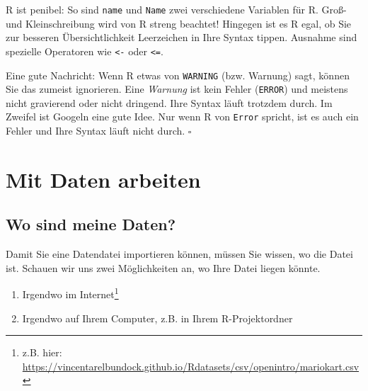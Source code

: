 \documentclass[
  letterpaper,
]{scrbook}
\providecommand{\tightlist}{%
  \setlength{\itemsep}{0pt}\setlength{\parskip}{0pt}}\usepackage{longtable,booktabs,array}
\theoremstyle{definition}
\theoremstyle{definition}
\theoremstyle{definition}
\theoremstyle{remark}
\begin{document}
\begin{tcolorbox}[enhanced jigsaw, colbacktitle=quarto-callout-caution-color!10!white, toptitle=1mm, colframe=quarto-callout-caution-color-frame, breakable, toprule=.15mm, bottomrule=.15mm, bottomtitle=1mm, left=2mm, opacitybacktitle=0.6, colback=white, arc=.35mm, coltitle=black, title=\textcolor{quarto-callout-caution-color}{\faFire}\hspace{0.5em}{Vorsicht}, opacityback=0, rightrule=.15mm, leftrule=.75mm, titlerule=0mm]

R ist penibel: So sind \texttt{name} und \texttt{Name} zwei verschiedene
Variablen für R. Groß- und Kleinschreibung wird von R streng beachtet!
Hingegen ist es R egal, ob Sie zur besseren Übersichtlichkeit
Leerzeichen in Ihre Syntax tippen. Ausnahme sind spezielle Operatoren
wie \texttt{\textless{}-} oder \texttt{\textless{}=}.

Eine gute Nachricht: Wenn R etwas von \texttt{WARNING} (bzw. Warnung)
sagt, können Sie das zumeist ignorieren. Eine \emph{Warnung} ist kein
Fehler (\texttt{ERROR}) und meistens nicht gravierend oder nicht
dringend. Ihre Syntax läuft trotzdem durch. Im Zweifel ist Googeln eine
gute Idee. Nur wenn R von \texttt{Error} spricht, ist es auch ein Fehler
und Ihre Syntax läuft nicht durch. \(\square\)

\end{tcolorbox}

\section{Mit Daten arbeiten}\label{mit-daten-arbeiten}

\subsection{Wo sind meine Daten?}\label{wo-sind-meine-daten}

Damit Sie eine Datendatei importieren können, müssen Sie wissen, wo die
Datei ist. Schauen wir uns zwei Möglichkeiten an, wo Ihre Datei liegen
könnte.

\begin{enumerate}
\def\labelenumi{\arabic{enumi}.}
\tightlist
\item
  Irgendwo im Internet\footnote{z.B. hier:
    \url{https://vincentarelbundock.github.io/Rdatasets/csv/openintro/mariokart.csv}}
\item
  Irgendwo auf Ihrem Computer, z.B. in Ihrem R-Projektordner
\end{enumerate}
\end{document}
